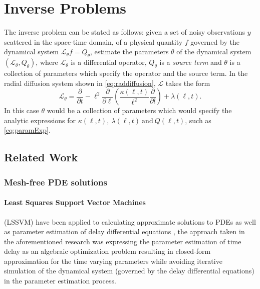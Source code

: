 \section{Inverse Problems}\label{sec:inv}

The inverse problem can be stated as follows: given a set of noisy observations $y$ scattered in 
the space-time domain, of a physical quantity $f$ governed by the dynamical system 
$\mathcal{L}_{\theta} f = Q_{\theta}$, estimate the parameters $\theta$ of the dynamical system 
$(\mathcal{L}_{\theta}, Q_{\theta})$, where $\mathcal{L}_{\theta}$ is a differential operator, 
$Q_{\theta}$ is a \emph{source term} and $\theta$ is a collection of parameters which specify the 
operator and the source term. In the radial diffusion system shown in \cref{eq:raddiffusion}, 
$\mathcal{L}$ takes the form  
%
\[
  \mathcal{L}_{\theta} =
    \frac{\partial}{\partial{t}} - 
    \ell^2 \frac{\partial}{\partial{\ell}}\left( 
      \frac{\kappa(\ell, t)}{\ell^{2}} \frac{\partial}{\partial{l}} 
    \right) + 
    \lambda(\ell,t).  
\] 
%
In this case $\theta$ would be a collection of parameters which would specify the analytic 
expressions for $\kappa(\ell, t), \ \lambda(\ell,t) \ \text{and} \ Q(\ell,t)$, such as 
\cref{eq:paramExp}.

\subsection{Related Work}

\subsubsection*{Mesh-free PDE solutions}

\paragraph{Least Squares Support Vector Machines} (LSSVM) have been applied to calculating 
approximate solutions to PDEs \citep{MEHRKANOON2015105,MEHRKANOON20122502} as well as parameter 
estimation of delay differential equations \citep{MEHRKANOON2014830}, the approach taken in the 
aforementioned research \citep{MEHRKANOON2014830} was expressing the parameter estimation of time 
delay as an algebraic optimization problem resulting in closed-form approximation for the time 
varying parameters while avoiding iterative simulation of the dynamical system (governed by the 
delay differential equations) in the parameter estimation process.

